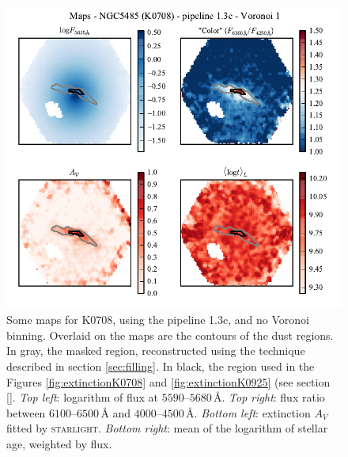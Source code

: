 \documentclass[a4paper]{article}
\newcommand{\angstrom}{\text{\AA}}
\def\starlight{\textsc{starlight}\xspace}
\begin{document}
\begin{figure}
\includegraphics{figures/maps_K0708_1.3c_v01.pdf}

\caption{Some maps for K0708, using the pipeline 1.3c, and no Voronoi binning.
Overlaid on the maps are the contours of the dust regions. In gray, the masked
region, reconstructed using the technique described in section
\ref{sec:filling}. In black, the region used in the Figures
\ref{fig:extinctionK0708} and \ref{fig:extinctionK0925} (see section \ref{}.
{\em Top left}:
logarithm of flux at $5590$--$5680\,\angstrom$.
{\em Top right}: flux ratio between $6100$--$6500\,\angstrom$ and
$4000$--$4500\,\angstrom$. {\em Bottom left}: extinction $A_V$ fitted by
\starlight. {\em Bottom right}: mean of the logarithm of stellar age, weighted
by flux.}

\label{fig:mapsK0708}
\end{figure}
\end{document}
